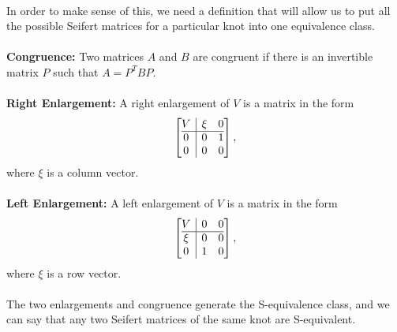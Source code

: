 \documentclass{article}
\begin{document}
\\
In order to make sense of this, we need a definition that will allow us to put all the possible Seifert matrices for a particular knot into one equivalence class.\\
\\%
\textbf{Congruence:} Two matrices $A$ and $B$ are congruent if there is an invertible matrix $P$ such that $A=P^TBP$.\\
\\
\textbf{Right Enlargement:} A right enlargement of $V$ is a matrix in the form $$\left[\begin{array}{@{}c|c@{}}
V & \begin{matrix} \xi & 0\end{matrix}\\
\hline
\begin{matrix}0\\0\end{matrix} & \begin{matrix}0&1\\0&0\end{matrix}
\end{array}\right],$$
where $\xi$ is a column vector.\\
\\
\textbf{Left Enlargement:} A left enlargement of $V$ is a matrix in the form $$\left[\begin{array}{@{}c|c@{}}
V & \begin{matrix}0&0\end{matrix}\\
\hline
\begin{matrix}\xi\\0\end{matrix}&\begin{matrix}0&0\\1&0\end{matrix}
\end{array}\right],$$
where $\xi$ is a row vector.\\
\\
The two enlargements and congruence generate the S-equivalence class, and we can say that any two Seifert matrices of the same knot are S-equivalent.\\
\end{document}
